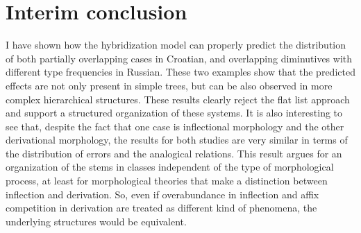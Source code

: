 
\section{Interim conclusion}

I have shown how the hybridization model can properly predict the distribution of both partially overlapping cases in Croatian, and overlapping diminutives with different type frequencies in Russian. These two examples show that the predicted effects are not only present in simple trees, but can be also observed in more complex hierarchical structures. These results clearly reject the flat list approach and support a structured organization of these systems. It is also interesting to see that, despite the fact that one case is inflectional morphology and the other derivational morphology, the results for both studies are very similar in terms of the distribution of errors and the analogical relations. This result argues for an organization of the stems in classes independent of the type of morphological process, at least for morphological theories that make a distinction between inflection and derivation. So, even if overabundance in inflection and affix competition in derivation are treated as different kind of phenomena, the underlying structures would be equivalent.

